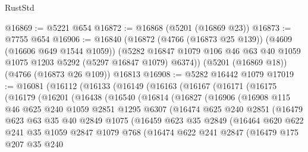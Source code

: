 \begin{lexlean}{RustStd}
\begin{coremodule}
{\begin{coremodule}
{{{{{{{{{{{{{{{{{{{{{{{{{{{{{{{{{{{@16869 := @5221 @654
@16872 := @16868 (@5201 (@16869 @23))
@16873 := @7755 @654
@16906 := @16840
    (@16872
      (@4766 (@16873 @25 @139))
      (@4609 (@16606 @649 @1544 @1059))
      (@5282 @16847 @1079 @106 @46 @63 @40 @1059 @1075 @1203 @5292 (@5297 @16847 @1079) @6374))
    (@5201 (@16869 @18))
    (@4766 (@16873 @26 @109))
    @16813
@16908 := @5282 @16442 @1079
@17019 := @16081
    (@16112
      (@16133
        (@16149
          (@16163
            (@16167
              (@16171
                (@16175
                  (@16179
                    (@16201
                      (@16438
                        (@16540
                          (@16814
                            (@16827
                              (@16906
                                (@16908
                                  @115
                                  @46
                                  @625
                                  @240
                                  @1059
                                  @2851
                                  @1295
                                  @6307
                                  (@16474
                                    @625
                                    @240
                                    @2851
                                    (@16479
                                      @623
                                      @63
                                      @35
                                      @40
                                      @2849
                                      @1075
                                      (@16459
                                        @623
                                        @35
                                        @2849
                                        (@16464
                                          @620
                                          @622
                                          @241
                                          @35
                                          @1059
                                          @2847
                                          @1079
                                          @768
                                          (@16474
                                            @622
                                            @241
                                            @2847
                                            (@16479
                                              @175
                                              @207
                                              @35
                                              @240
}}}}}}}}}}}}}}}}}}}}}}}}}}}}}}}}}}}
\end{coremodule}}
\end{coremodule}
\end{lexlean}
